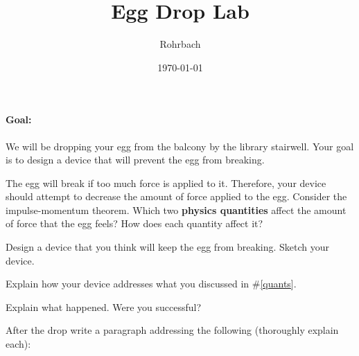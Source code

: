 \documentclass[10pt]{exam}
\title{Egg Drop Lab}
\author{Rohrbach}
\date{\today}
\begin{document}
\maketitle

\paragraph{Goal:} 
  We will be dropping your egg from the balcony by the library stairwell.  Your goal is to design a device that will prevent the egg from breaking.

\begin{questions}
  
    \question \label{quants}
      The egg will break if too much force is applied to it.  Therefore, your device should attempt to decrease the amount of force applied to the egg.  Consider the impulse-momentum theorem.  Which two {\bf physics quantities} affect the amount of force that the egg feels?  How does each quantity affect it?
      \vs
    
    \question
      Design a device that you think will keep the egg from breaking.  Sketch your device.
      \vs[2]
    
    \question
      Explain how your device addresses what you discussed in \#\ref{quants}.
      \vs

  \pagebreak
  
  
  
    \question
      Explain what happened.  Were you successful?
      \vspace{8em}
  
  
  
    \question
  
      After the drop write a paragraph addressing the following (thoroughly explain each):

\end{questions}
\end{document}
